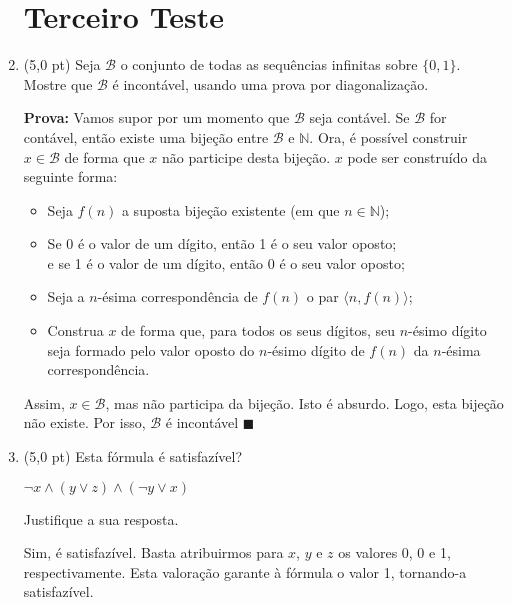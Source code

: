 \documentclass[12pt,a4paper,oneside]{article}
\begin{document}
\begin{enumerate}
	
	\section*{Terceiro Teste}
	
	\item (5,0 pt) Seja $\mathcal{B}$ o conjunto de todas as sequências infinitas sobre $\{0,1\}$. Mostre que $\mathcal{B}$ é
incontável, usando uma prova por diagonalização.
	
	\vspace*{0.5cm}	
	
	{\color{blue}
		{\bf Prova:} Vamos supor por um momento que $\mathcal{B}$ seja contável. Se $\mathcal{B}$ for contável, então existe uma bijeção entre $\mathcal{B}$ e $\mathbb{N}$. Ora, é possível construir $x \in \mathcal{B}$ de forma que $x$ não participe desta bijeção. $x$ pode ser construído da seguinte forma:
			\begin{itemize}
				\item Seja $f(n)$ a suposta bijeção existente (em que $n \in \mathbb{N}$);
				\item Se 0 é o valor de um dígito, então 1 é o seu valor oposto; \\
					  e se 1 é o valor de um dígito, então 0 é o seu valor oposto;
				\item Seja a $n$-ésima correspondência de $f(n)$ o par $\langle n, f(n) \rangle$;
				\item Construa $x$ de forma que, para todos os seus dígitos, seu $n$-ésimo dígito seja formado pelo valor oposto do $n$-ésimo dígito de $f(n)$ da $n$-ésima correspondência.
			\end{itemize}
			Assim, $x \in \mathcal{B}$, mas não participa da bijeção. Isto é absurdo. Logo, esta bijeção não existe. Por isso, $\mathcal{B}$ é incontável $\blacksquare$
	}
	
	\newpage
	
	\item (5,0 pt) Esta fórmula é satisfazível?
		\begin{center}
			$ \neg x \wedge (y \vee z) \wedge (\neg y \vee x)$
		\end{center}
		Justifique a sua resposta.
		
		\vspace*{0.5cm}
		
		{\color{blue}
			Sim, é satisfazível. Basta atribuirmos para $x$, $y$ e $z$ os valores 0, 0 e 1, respectivamente. Esta valoração garante à fórmula o valor 1, tornando-a satisfazível.
		}
		

\end{enumerate}
\end{document}
